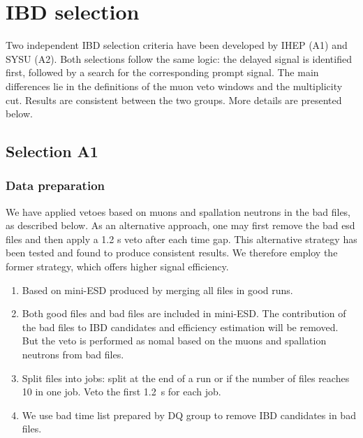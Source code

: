 \section{IBD selection}

Two independent IBD selection criteria have been developed by IHEP (A1) and SYSU (A2). Both selections follow the same logic: the delayed signal is identified first, followed by a search for the corresponding prompt signal. The main differences lie in the definitions of the muon veto windows and the multiplicity cut. Results are consistent between the two groups.
More details are presented below.

\subsection{Selection A1}

\subsubsection{Data preparation} 
    We have applied vetoes based on muons and spallation neutrons in the bad files, as described below. As an alternative approach, one may first remove the bad esd files and then apply a 1.2 s veto after each time gap. This alternative strategy has been tested and found to produce consistent results. We therefore employ the former strategy, which offers higher signal efficiency.
    \begin{enumerate}
        \item Based on mini-ESD produced by merging all files in good runs.
        \item Both good files and bad files are included in mini-ESD. The contribution of the bad files to IBD candidates and efficiency estimation will be removed. But the veto is performed as nomal based on the muons and spallation neutrons from bad files. 
        \item Split files into jobs: split at the end of a run or if the number of files reaches 10 in one job. Veto the first 1.2~s for each job.
        \item We use bad time list prepared by DQ group to remove IBD candidates in bad files. 
    \end{enumerate}
